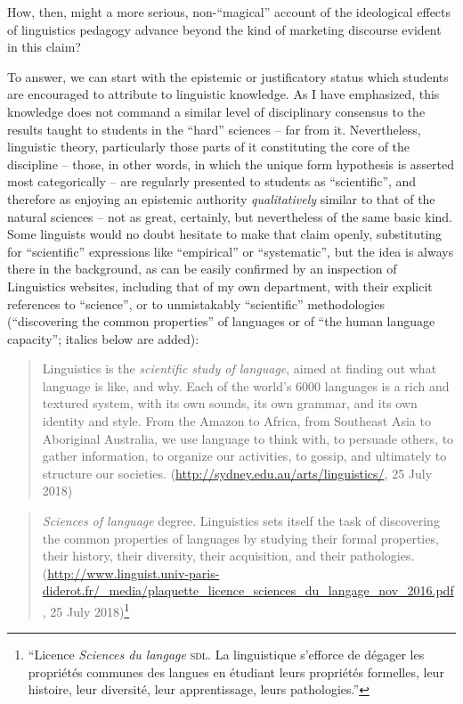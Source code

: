 \documentclass[output=paper]{langscibook}
\begin{document}
How, then, might a more serious, non-``magical'' account of the ideological effects of linguistics pedagogy advance beyond the kind of marketing discourse evident in this claim?

To answer, we can start with the epistemic or justificatory status which students are encouraged to attribute to linguistic knowledge. As I have emphasized, this knowledge does not command a similar level of disciplinary consensus to the results taught to students in the ``hard'' sciences -- far from it.  Nevertheless, linguistic theory, particularly those parts of it constituting the core of the discipline -- those, in other words, in which the unique form hypothesis is asserted most categorically -- are regularly presented to students as ``scientific'', and therefore as enjoying an epistemic authority \emph{qualitatively} similar to that of the natural sciences -- not as great, certainly, but nevertheless of the same basic kind. Some linguists would no doubt hesitate to make that claim openly, substituting for ``scientific'' expressions like ``empirical'' or ``systematic'', but the idea is always there in the background, as can be easily confirmed by an inspection of Linguistics websites, including that of my own department, with their explicit references to ``science'', or to unmistakably ``scientific'' methodologies (``discovering the common properties'' of languages or of ``the human language capacity''; italics below are added):

\begin{quotation}
Linguistics is the \emph{scientific study of language}, aimed at finding out what language is like, and why. Each of the world's 6000 languages is a rich and textured system, with its own sounds, its own grammar, and its own identity and style. From the Amazon to Africa, from Southeast Asia to Aboriginal Australia, we use language to think with, to persuade others, to gather information, to organize our activities, to gossip, and ultimately to structure our societies.
(\url{http://sydney.edu.au/arts/linguistics/}, 25 July 2018)
\end{quotation}

\begin{quotation}
\emph{Sciences of language} degree. Linguistics sets itself the task of discovering the common properties of languages by studying their formal properties, their history, their diversity, their acquisition, and their pathologies.
(\url{http://www.linguist.univ-paris-diderot.fr/\_media/plaquette_licence_sciences_du_langage_nov_2016.pdf}, 25 July 2018)\footnote{``Licence \emph{Sciences du langage} \textsc{sdl}. La linguistique s'efforce de dégager les propriétés communes des langues en étudiant leurs propriétés formelles, leur histoire, leur diversité, leur apprentissage, leurs pathologies.''}
\end{quotation}
\end{document}
